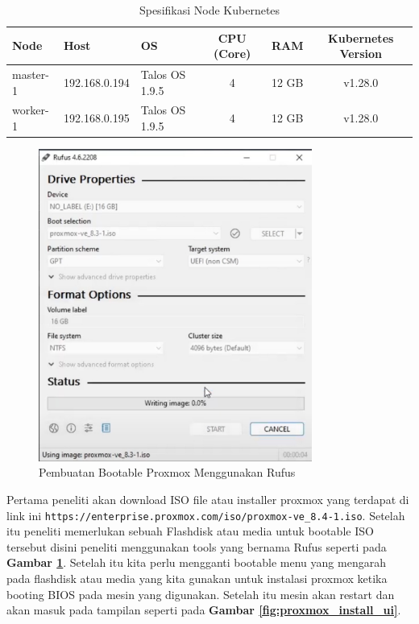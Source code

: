 \begin{table}[H]
  \centering
  \begin{tabular}{|l|l|l|c|c|c|}
    \hline
    \textbf{Node} & \textbf{Host} & \textbf{OS}    & \textbf{CPU (Core)} & \textbf{RAM} & \textbf{Kubernetes Version} \\
    \hline
    master-1      & 192.168.0.194 & Talos OS 1.9.5 & 4                   & 12 GB        & v1.28.0                     \\
    \hline
    worker-1      & 192.168.0.195 & Talos OS 1.9.5 & 4                   & 12 GB        & v1.28.0                     \\
    \hline
  \end{tabular}
  \caption{Spesifikasi Node Kubernetes}
  \label{tab:node-kubernetes}
\end{table}
\begin{figure}[H]
  \centering
  \includegraphics[width=0.8\textwidth]{figures/proxmox-install-rufus-1.jpg}
  \caption{Pembuatan Bootable Proxmox Menggunakan Rufus}
  \label{fig:proxmox_rufus}
\end{figure}
Pertama peneliti akan download ISO file atau installer proxmox yang terdapat di
link ini \verb|https://enterprise.proxmox.com/iso/proxmox-ve_8.4-1.iso|. Setelah
itu peneliti memerlukan sebuah Flashdisk atau media untuk bootable ISO
tersebut disini peneliti menggunakan tools yang bernama Rufus seperti pada \textbf{Gambar \ref{fig:proxmox_rufus}}. Setelah itu kita perlu mengganti bootable menu yang mengarah pada flashdisk
atau media yang kita gunakan untuk instalasi proxmox ketika booting BIOS pada
mesin yang digunakan. Setelah itu mesin akan restart dan akan masuk pada tampilan
seperti pada \textbf{Gambar \ref{fig:proxmox_install_ui}}.

